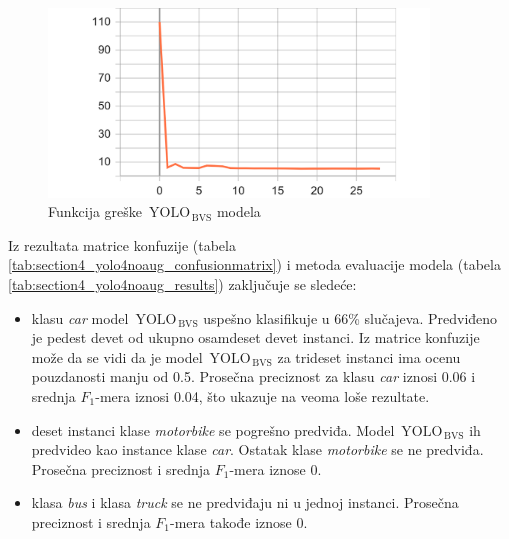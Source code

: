 \documentclass[12pt,oneside]{memoir}
\newcommand{\yolo}{\ensuremath{\,\textrm{YOLO}}}
\newcommand{\bvs}{\ensuremath{\,\textrm{BVS}}}
\begin{document}
\begin{figure}[!ht]
\centering
  \includegraphics[width=0.90\textwidth]{matfmaster/yolo/v4/without_augmentation/epoch_loss.png}
\caption{Funkcija greške $\yolo_{\bvs}$ modela}
\label{fig:section4_yolo4noaug_loss}
\end{figure}

Iz rezultata matrice konfuzije (tabela \ref{tab:section4_yolo4noaug_confusionmatrix}) i metoda evaluacije modela (tabela \ref{tab:section4_yolo4noaug_results}) zaključuje se sledeće:
\begin{itemize}
    \item klasu \textit{car} model $\yolo_{\bvs}$ uspešno klasifikuje u 66\% slučajeva. Predviđeno je pedest devet od ukupno osamdeset devet instanci. Iz matrice konfuzije može da se vidi da je model $\yolo_{\bvs}$ za trideset instanci ima ocenu pouzdanosti manju od 0.5.  Prosečna preciznost za klasu \textit{car} iznosi 0.06 i srednja $F_1$-mera iznosi 0.04, što ukazuje na veoma loše rezultate.
    \item deset instanci klase \textit{motorbike} se pogrešno predviđa. Model $\yolo_{\bvs}$ ih  predvideo kao instance klase \textit{car}. Ostatak klase \textit{motorbike} se ne predviđa. Prosečna preciznost i srednja $F_1$-mera iznose 0.
    \item klasa \textit{bus} i klasa \textit{truck} se ne predviđaju ni u jednoj instanci. Prosečna preciznost i srednja $F_1$-mera takođe iznose 0.
\end{itemize}
\end{document}
